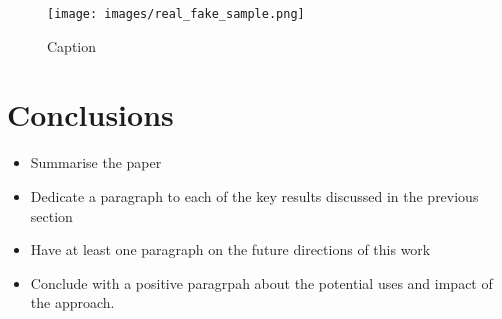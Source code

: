 \documentclass[%
 reprint,
 amsmath,amssymb,
 aps,
]{revtex4-2}
\begin{document}
\begin{figure}
    \centering
    \texttt{[image: images/real\_fake\_sample.png]}
    \caption{Caption}
    \label{fig:my_label}
\end{figure}


\section{Conclusions}

\begin{itemize}
\item Summarise the paper
\item Dedicate a paragraph to each of the key results discussed in the previous
section
\item Have at least one paragraph on the future directions of this work
\item Conclude with a positive paragrpah about the potential uses and impact of
the approach.
\end{itemize}


\Appendix
\end{document}
